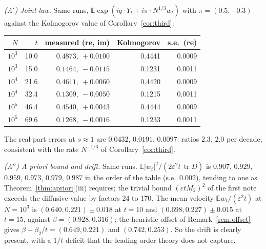 \documentclass[11pt]{article}
\newcommand{\E}{\mathbb{E}}
\newcommand{\eps}{\varepsilon}
\newcommand{\tr}{\operatorname{tr}}
\theoremstyle{remark}
\begin{document}
\emph{(A$'$) Joint law.} Same runs, $\E\exp(iq\cdot Y_t + i\pi\cdot N^{1/3}w_t)$
with $\pi = (0.5,-0.3)$ against the Kolmogorov value of
Corollary~\ref{cor:third}:
\begin{center}
\small
\begin{tabular}{rrrrr}
  $N$ & $t$ & measured (re, im) & Kolmogorov & s.e.\ (re) \\ \hline
  $10^3$ & 10.0 & $0.4873,\ +0.0100$ & 0.4441 & 0.0009 \\
  $10^3$ & 15.0 & $0.1464,\ -0.0115$ & 0.1231 & 0.0011 \\
  $10^4$ & 21.6 & $0.4611,\ +0.0060$ & 0.4420 & 0.0009 \\
  $10^4$ & 32.4 & $0.1309,\ -0.0050$ & 0.1215 & 0.0011 \\
  $10^5$ & 46.4 & $0.4540,\ +0.0043$ & 0.4444 & 0.0009 \\
  $10^5$ & 69.6 & $0.1268,\ -0.0016$ & 0.1233 & 0.0011 \\
\end{tabular}
\end{center}
The real-part errors at $s\approx1$ are $0.0432$, $0.0191$, $0.0097$: ratios
$2.3$, $2.0$ per decade, consistent with the rate $N^{-1/3}$ of
Corollary~\ref{cor:third}.

\emph{(A$''$) A priori bound and drift.} Same runs.
$\E|w_t|^2/(2\eps^2t\,\tr D)$ is $0.907$, $0.929$, $0.959$, $0.973$, $0.979$,
$0.987$ in the order of the table (s.e.\ $0.002$), tending to one as
Theorem~\ref{thm:apriori}(iii) requires; the trivial bound
$(\eps tM_2)^2$ of the first note exceeds the diffusive value by factors
$24$ to $170$. The mean velocity $\E w_t/(\eps^2t)$ at $N=10^3$ is
$(0.640,0.221)\pm0.018$ at $t=10$ and $(0.698,0.227)\pm0.015$ at $t=15$,
against $\beta = (0.928,0.316)$; the heuristic offset of
Remark~\ref{rem:offset} gives $\beta-\beta_2/t = (0.649,0.221)$ and
$(0.742,0.253)$. So the drift is clearly present, with a $1/t$ deficit that
the leading-order theory does not capture.
\end{document}
